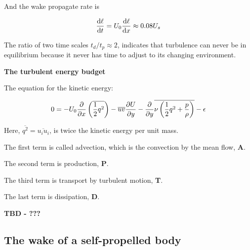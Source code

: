 \documentclass{article}
\begin{document}
And the wake propagate rate is

\begin{equation*}
    \frac{\mathop{}\!\mathrm{d}\ell}{\mathop{}\!\mathrm{d}t}=U_0\frac{\mathop{}\!\mathrm{d}\ell}{\mathop{}\!\mathrm{d}x}\approx 0.08 U_s
\end{equation*}

The ratio of two time scales $t_d/t_p\approx2$, indicates that turbulence can never be in equilibrium because it never has time to adjust to its changing environment.

\textbf{The turbulent energy budget}

The equation for the kinetic energy:

\begin{equation*}
    0=-U_0\frac{\mathop{}\!\partial}{\mathop{}\!\partial x}\left(\overline{\frac{1}{2}q^2}\right)-\overline{uv}\frac{\mathop{}\!\partial U}{\mathop{}\!\partial y}-\frac{\mathop{}\!\partial}{\mathop{}\!\partial y}\overline{\nu\left(\frac{1}{2}q^2+\frac{p}{\rho}\right)}-\epsilon
\end{equation*}

Here, $\overline{q^2}=\overline{u_iu_i}$, is twice the kinetic energy per unit mass.

The first term is called advection, which is the convection by the mean flow, \textbf{A}.

The second term is production, \textbf{P}.

The third term is transport by turbulent motion, \textbf{T}.

The last term is dissipation, \textbf{D}.

\textbf{TBD - ???}

\subsection{The wake of a self-propelled body}










\ifx\allfiles\undefined         %
\end{document}

